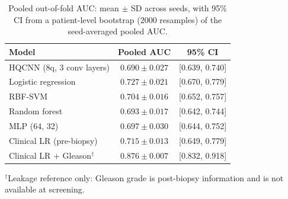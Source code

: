 \begin{table}[t]
\centering
\caption{Pooled out-of-fold AUC: mean $\pm$ SD across seeds, with 95\% CI from a patient-level bootstrap (2000 resamples) of the seed-averaged pooled AUC.}
\label{tab:v3_pooled}
\small
\begin{tabular}{lcc}
\toprule
Model & Pooled AUC & 95\% CI \\
\midrule
HQCNN (8q, 3 conv layers) & $0.690 \pm 0.027$ & [0.639, 0.740] \\
Logistic regression & $0.727 \pm 0.021$ & [0.670, 0.779] \\
RBF-SVM & $0.704 \pm 0.016$ & [0.652, 0.757] \\
Random forest & $0.693 \pm 0.017$ & [0.642, 0.744] \\
MLP (64, 32) & $0.697 \pm 0.030$ & [0.644, 0.752] \\
Clinical LR (pre-biopsy) & $0.715 \pm 0.013$ & [0.649, 0.779] \\
Clinical LR + Gleason$^{\dagger}$ & $0.876 \pm 0.007$ & [0.832, 0.918] \\
\bottomrule
\end{tabular}
\par\smallskip\footnotesize $^{\dagger}$Leakage reference only: Gleason grade is post-biopsy information and is not available at screening.
\end{table}
